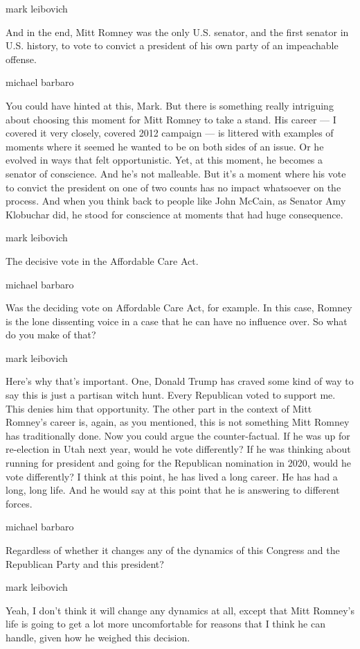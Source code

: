 mark leibovich

And in the end, Mitt Romney was the only U.S. senator, and the first
senator in U.S. history, to vote to convict a president of his own party
of an impeachable offense.

michael barbaro

You could have hinted at this, Mark. But there is something really
intriguing about choosing this moment for Mitt Romney to take a stand.
His career --- I covered it very closely, covered 2012 campaign --- is
littered with examples of moments where it seemed he wanted to be on
both sides of an issue. Or he evolved in ways that felt opportunistic.
Yet, at this moment, he becomes a senator of conscience. And he's not
malleable. But it's a moment where his vote to convict the president on
one of two counts has no impact whatsoever on the process. And when you
think back to people like John McCain, as Senator Amy Klobuchar did, he
stood for conscience at moments that had huge consequence.

mark leibovich

The decisive vote in the Affordable Care Act.

michael barbaro

Was the deciding vote on Affordable Care Act, for example. In this case,
Romney is the lone dissenting voice in a case that he can have no
influence over. So what do you make of that?

mark leibovich

Here's why that's important. One, Donald Trump has craved some kind of
way to say this is just a partisan witch hunt. Every Republican voted to
support me. This denies him that opportunity. The other part in the
context of Mitt Romney's career is, again, as you mentioned, this is not
something Mitt Romney has traditionally done. Now you could argue the
counter-factual. If he was up for re-election in Utah next year, would
he vote differently? If he was thinking about running for president and
going for the Republican nomination in 2020, would he vote differently?
I think at this point, he has lived a long career. He has had a long,
long life. And he would say at this point that he is answering to
different forces.

michael barbaro

Regardless of whether it changes any of the dynamics of this Congress
and the Republican Party and this president?

mark leibovich

Yeah, I don't think it will change any dynamics at all, except that Mitt
Romney's life is going to get a lot more uncomfortable for reasons that
I think he can handle, given how he weighed this decision.

